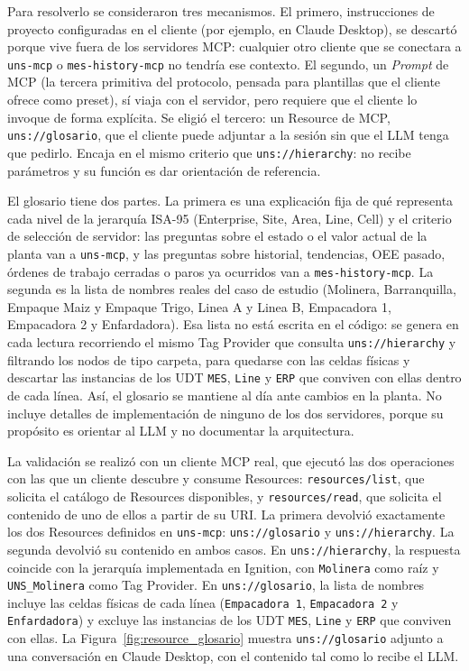 Para resolverlo se consideraron tres mecanismos. El primero, instrucciones de proyecto configuradas en el cliente (por ejemplo, en Claude Desktop), se descartó porque vive fuera de los servidores MCP: cualquier otro cliente que se conectara a \texttt{uns-mcp} o \texttt{mes-history-mcp} no tendría ese contexto. El segundo, un \textit{Prompt} de MCP (la tercera primitiva del protocolo, pensada para plantillas que el cliente ofrece como preset), sí viaja con el servidor, pero requiere que el cliente lo invoque de forma explícita. Se eligió
el tercero: un Resource de MCP, \texttt{uns://glosario}, que el cliente puede adjuntar a la sesión sin que el LLM tenga que pedirlo. Encaja en el mismo criterio que \texttt{uns://hierarchy}: no recibe parámetros y su función es dar orientación de referencia.

El glosario tiene dos partes. La primera es una explicación fija de qué representa cada nivel de la jerarquía ISA-95 (Enterprise, Site, Area, Line, Cell) y el criterio de selección de servidor: las preguntas sobre el estado o el valor actual de la planta van a \texttt{uns-mcp}, y las preguntas sobre historial, tendencias, OEE pasado, órdenes de trabajo cerradas o paros ya ocurridos van a \texttt{mes-history-mcp}. La segunda es la lista de nombres reales del caso de estudio (Molinera, Barranquilla, Empaque Maiz y Empaque Trigo, Linea A y Linea B, Empacadora 1, Empacadora 2 y Enfardadora). Esa lista no está escrita en el código: se genera en cada lectura recorriendo el mismo Tag Provider que consulta \texttt{uns://hierarchy} y filtrando los nodos de tipo carpeta, para quedarse con las celdas físicas y descartar las instancias de los UDT \texttt{MES}, \texttt{Line} y \texttt{ERP} que conviven con ellas dentro de cada línea. Así, el glosario se mantiene al día ante cambios en la planta. No incluye detalles de implementación de ninguno de los dos servidores, porque su propósito es orientar al LLM y no documentar la arquitectura.

La validación se realizó con un cliente MCP real, que ejecutó las dos operaciones con las que un cliente descubre y consume Resources: \texttt{resources/list}, que solicita el catálogo de Resources disponibles, y \texttt{resources/read}, que solicita el contenido de uno de ellos a partir de su URI. La primera devolvió exactamente los dos Resources definidos en \texttt{uns-mcp}: \texttt{uns://glosario} y \texttt{uns://hierarchy}. La segunda devolvió su contenido en ambos casos. En \texttt{uns://hierarchy}, la respuesta coincide con la jerarquía implementada en Ignition, con \texttt{Molinera} como raíz y \texttt{UNS\_Molinera} como Tag Provider. En \texttt{uns://glosario}, la lista de nombres incluye las celdas físicas de cada línea (\texttt{Empacadora 1}, \texttt{Empacadora 2} y \texttt{Enfardadora}) y excluye las instancias de los UDT \texttt{MES}, \texttt{Line} y \texttt{ERP} que conviven con ellas. La Figura~\ref{fig:resource_glosario} muestra \texttt{uns://glosario} adjunto a una conversación en Claude Desktop, con el contenido tal como lo recibe el LLM.

